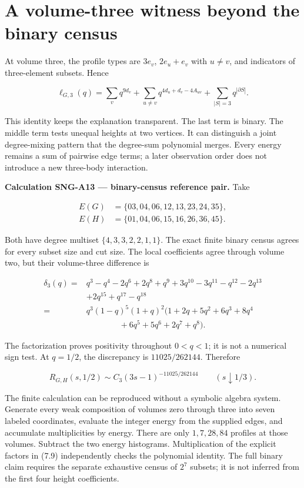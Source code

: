 \documentclass[
  11pt,
  a4paper,
]{report}
\begin{document}
\hypertarget{a-volume-three-witness-beyond-the-binary-census}{%
\section{A volume-three witness beyond the binary
census}\label{a-volume-three-witness-beyond-the-binary-census}}

At volume three, the profile types are \(3e_v\), \(2e_u+e_v\) with
\(u\ne v\), and indicators of three-element subsets. Hence

\[
 \ell_{G,3}(q)=\sum_vq^{9d_v}
 +\sum_{u\ne v}q^{4d_u+d_v-4A_{uv}}
 +\sum_{|S|=3}q^{|\partial S|}.
 \tag{7.8}
\]

This identity keeps the explanation transparent. The last term is
binary. The middle term tests unequal heights at two vertices. It can
distinguish a joint degree-mixing pattern that the degree-sum polynomial
merges. Every energy remains a sum of pairwise edge terms; a later
observation order does not introduce a new three-body interaction.

\textbf{Calculation SNG-A13 --- binary-census reference pair.} Take

\[
 \begin{aligned}
 E(G)&=\{03,04,06,12,13,23,24,35\},\\
 E(H)&=\{01,04,06,15,16,26,36,45\}.
 \end{aligned}
\]

Both have degree multiset \(\{4,3,3,2,2,1,1\}\). The exact finite binary
census agrees for every subset size and cut size. The local coefficients
agree through volume two, but their volume-three difference is

\[
 \begin{aligned}
 \delta_3(q)={}&q^3-q^4-2q^6+2q^8+q^9+3q^{10}
 -3q^{11}-q^{12}-2q^{13}\\
 &+2q^{15}+q^{17}-q^{18}\\
 ={}&q^3(1-q)^5(1+q)^2
 (1+2q+5q^2+6q^3+8q^4\\
 &\qquad\qquad+6q^5+5q^6+2q^7+q^8).
 \end{aligned}
 \tag{7.9}
\]

The factorization proves positivity throughout \(0<q<1\); it is not a
numerical sign test. At \(q=1/2\), the discrepancy is \(11025/262144\).
Therefore

\[
 R_{G,H}(s,1/2)
 \sim C_3(3s-1)^{-11025/262144}
 \qquad(s\downarrow1/3).
 \tag{7.10}
\]

The finite calculation can be reproduced without a symbolic algebra
system. Generate every weak composition of volumes zero through three
into seven labeled coordinates, evaluate the integer energy from the
supplied edges, and accumulate multiplicities by energy. There are only
\(1,7,28,84\) profiles at those volumes. Subtract the two energy
histograms. Multiplication of the explicit factors in (7.9)
independently checks the polynomial identity. The full binary claim
requires the separate exhaustive census of \(2^7\) subsets; it is not
inferred from the first four height coefficients.
\end{document}
